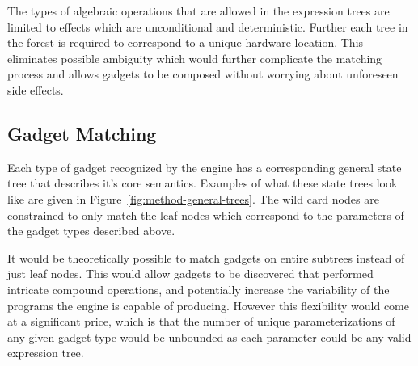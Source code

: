     The types of algebraic operations that are allowed in the expression trees
    are limited to effects which are unconditional and deterministic. Further
    each tree in the forest is required to correspond to a unique hardware
    location. This eliminates possible ambiguity which would further complicate
    the matching process and allows gadgets to be composed without worrying
    about unforeseen side effects.
    
    \subsection{Gadget Matching}

    Each type of gadget recognized by the engine has a corresponding general
    state tree that describes it's core semantics. Examples of what these state
    trees look like are given in Figure~\ref{fig:method-general-trees}. The wild
    card nodes are constrained to only match the leaf nodes which correspond to
    the parameters of the gadget types described above.

    It would be theoretically possible to match gadgets on entire subtrees
    instead of just leaf nodes. This would allow gadgets to be discovered that
    performed intricate compound operations, and potentially increase the
    variability of the programs the engine is capable of producing. However this
    flexibility would come at a significant price, which is that the number of
    unique parameterizations of any given gadget type would be unbounded as each
    parameter could be any valid expression tree.

